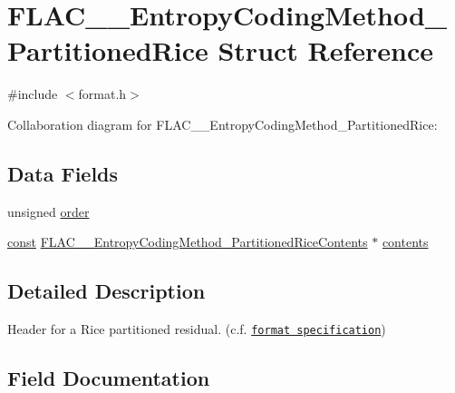 \hypertarget{struct_f_l_a_c_____entropy_coding_method___partitioned_rice}{}\section{F\+L\+A\+C\+\_\+\+\_\+\+Entropy\+Coding\+Method\+\_\+\+Partitioned\+Rice Struct Reference}
\label{struct_f_l_a_c_____entropy_coding_method___partitioned_rice}


{\ttfamily \#include $<$format.\+h$>$}



Collaboration diagram for F\+L\+A\+C\+\_\+\+\_\+\+Entropy\+Coding\+Method\+\_\+\+Partitioned\+Rice\+:
\subsection*{Data Fields}
\begin{DoxyCompactItemize}
\item 
unsigned \hyperlink{struct_f_l_a_c_____entropy_coding_method___partitioned_rice_a1e1c9049e31eab5113c245164b2c694a}{order}
\item 
\hyperlink{zconf_8h_a2c212835823e3c54a8ab6d95c652660e}{const} \hyperlink{struct_f_l_a_c_____entropy_coding_method___partitioned_rice_contents}{F\+L\+A\+C\+\_\+\+\_\+\+Entropy\+Coding\+Method\+\_\+\+Partitioned\+Rice\+Contents} $\ast$ \hyperlink{struct_f_l_a_c_____entropy_coding_method___partitioned_rice_a2fbfa1bd5656bf620c0bb9f8ba77f579}{contents}
\end{DoxyCompactItemize}


\subsection{Detailed Description}
Header for a Rice partitioned residual. (c.\+f. \href{../format.html#partitioned_rice}{\tt format specification}) 

\subsection{Field Documentation}
\mbox{\label{struct_f_l_a_c_____entropy_coding_method___partitioned_rice_a2fbfa1bd5656bf620c0bb9f8ba77f579}} 
